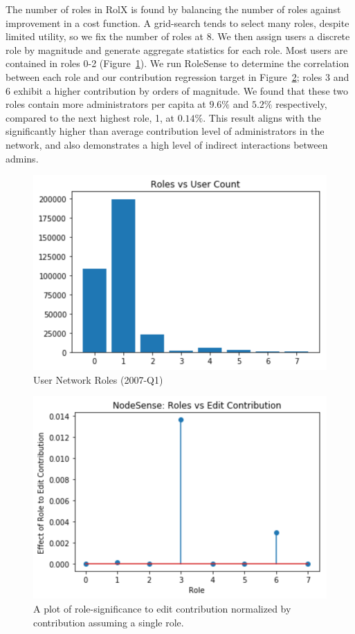 \documentclass[letterpaper, 12pt, conference]{ieeeconf}
\begin{document}
The number of roles in RolX is found by balancing the number of roles against improvement in a cost function. A grid-search tends to select many roles, despite limited utility, so we fix the number of roles at 8. 
We then assign users a discrete role by magnitude and generate aggregate statistics for each role. Most users are contained in roles 0-2 (Figure~\ref{fig:uu_proj_roles}). We run RoleSense to determine the correlation between each role and our contribution regression target in Figure~\ref{fig:nodesense}; roles 3 and 6 exhibit a higher contribution by orders of magnitude. We found that these two roles contain more administrators per capita at $9.6\%$ and $5.2\%$ respectively, compared to the next highest role, 1, at $0.14\%$. This result aligns with the significantly higher than average contribution level of administrators in the network, and also demonstrates a high level of indirect interactions between admins.

\begin{figure}
    \centering
    \includegraphics[width=1\linewidth]{role_counts.png}
    \caption{User Network Roles (2007-Q1)}
    \label{fig:uu_proj_roles}
\end{figure}

\begin{figure}
    \centering
    \includegraphics[width=1\linewidth]{nodesense.png}
    \caption{A plot of role-significance to edit contribution normalized by contribution assuming a single role.}
    \label{fig:nodesense}
\end{figure}
\end{document}
